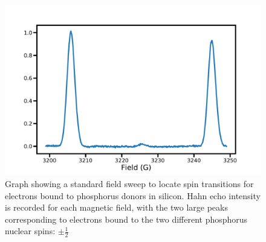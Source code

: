 \begin{figure}
\centering
\includegraphics[width=\columnwidth]{Figures/fieldSweep.pdf}
\caption[Phosphorus field sweep]{Graph showing a standard field sweep to locate spin transitions for electrons bound to phosphorus donors in silicon. Hahn echo intensity is recorded for each magnetic field, with the two large peaks corresponding to electrons bound to the two different phosphorus nuclear spins: $\pm \frac{1}{2}$}
\label{fig:fieldSweep}
\end{figure} 

